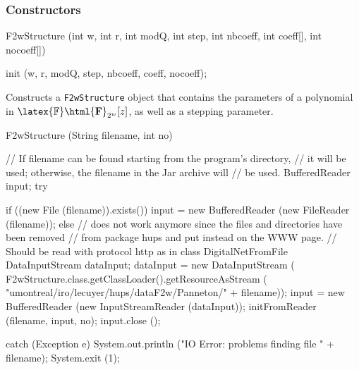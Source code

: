 \subsubsection* {Constructors}
\begin{code}


   F2wStructure (int w, int r, int modQ, int step, int nbcoeff,
                 int coeff[], int nocoeff[]) \begin{hide}
   {
      init (w, r, modQ, step, nbcoeff, coeff, nocoeff);
   }
\end{hide}
\end{code}
\begin{tabb}
  Constructs a \texttt{F2wStructure} object that contains  the parameters of a
  polynomial in $\latex{\mathbb{F}}\html{\mathbf{F}}_{2^w}[z]$,
 as well as a stepping parameter.
\end{tabb}
\begin{code}

   F2wStructure (String filename, int no)\begin{hide}
   {
     // If filename can be found starting from the program's directory,
     // it will be used; otherwise, the filename in the Jar archive will
     // be used.
     BufferedReader input;
     try {
       if ((new File (filename)).exists()) {
          input = new BufferedReader (new FileReader (filename));
       } else {
          // does not work anymore since the files and directories have been removed
          // from package hups and put instead on the WWW page.
          // Should be read with protocol http as in class DigitalNetFromFile
          DataInputStream dataInput;
          dataInput = new DataInputStream (
             F2wStructure.class.getClassLoader().getResourceAsStream (
                 "umontreal/iro/lecuyer/hups/dataF2w/Panneton/" + filename));
          input = new BufferedReader (new InputStreamReader (dataInput));
       }
       initFromReader (filename, input, no);
       input.close ();

     } catch (Exception e) {
       System.out.println ("IO Error: problems finding file " + filename);
       System.exit (1);
     }
   }\end{hide}
\end{code}
